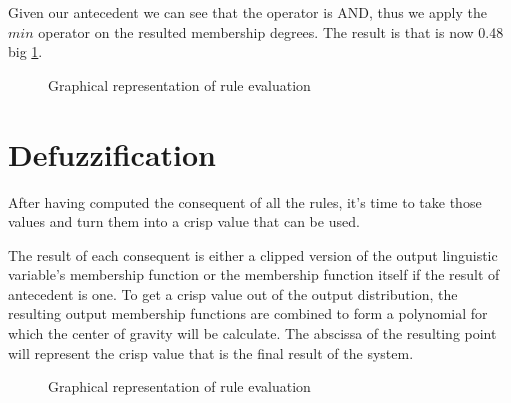 Given our antecedent  we can see that the operator is AND, thus we
apply the $min$ operator on the resulted membership degrees. The result is that  is now 0.48 big
\ref{fig:rule_eval}.

\begin{figure}[h!]
    \centerline{}
    \caption[Graphical representation of rule evaluation]{Graphical representation of rule evaluation}
\label{fig:rule_eval}
\end{figure}

\section{Defuzzification}

\qquad After having computed the consequent of all the rules, it's time to take those values and turn them
into a crisp value that can be used.

\quad The result of each consequent is either a clipped version of the output linguistic variable's
membership function or the membership function itself if the result of antecedent is one.
To get a crisp value out of the output distribution, the resulting output membership functions are combined
to form a polynomial for which the center of gravity will be calculate. The abscissa of the resulting point
will represent the crisp value that is the final result of the system.

\begin{figure}[h!]
    \centerline{}
    \caption[Graphical representation of rule evaluation]{Graphical representation of rule evaluation}
\label{fig:final_res}
\end{figure}

